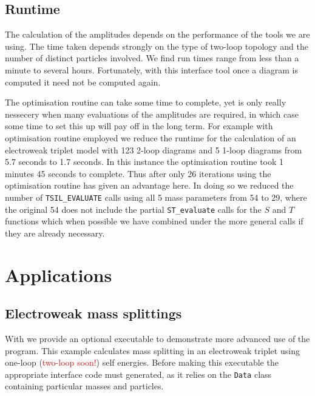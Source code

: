 \subsection{Runtime}

The calculation of the amplitudes depends on the performance of the tools we are using.  The time taken depends strongly on the type of two-loop topology and the number of distinct particles involved.  We find run times range from less than a minute to several hours.  Fortunately, with this interface tool once a diagram is computed it need not be computed again.

The optimisation routine can take some time to complete, yet is only really nessecery when many evaluations of the amplitudes are required, in which case some time to set this up will pay off in the long term.  For example with optimisation routine employed we reduce the runtime for the calculation of an electroweak triplet model with 123 2-loop diagrams and 5 1-loop diagrams from 5.7 seconds to 1.7 seconds.  In this instance the optimisation routine took 1 minutes 45 seconds to complete.  Thus after only 26 iterations using the optimisation routine has given an advantage here.  In doing so we reduced the number of \lstinline{TSIL_EVALUATE} calls using all 5 mass parameters from 54 to 29, where the original 54 does not include the partial \lstinline{ST_evaluate} calls for the $S$ and $T$ functions which when possible we have combined under the more general calls if they are already necessary.


\section{Applications}

\subsection{Electroweak mass splittings}

With \mb we provide an optional executable to demonstrate more advanced use of the program.  This example calculates mass splitting in an electroweak triplet using one-loop (\textcolor{red}{two-loop soon!}) self energies.  Before making this executable the appropriate \tsil interface code must generated, as it relies on the \lstinline{Data} class containing particular masses and particles.

